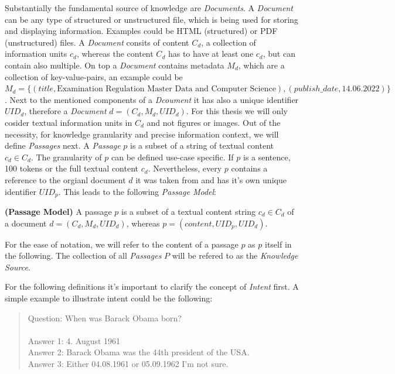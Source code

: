 Substantially the fundamental source of knowledge are \textit{Documents}. A \textit{Document} can be any type of structured or unstructured file, which is being used for storing and displaying information. Examples could be HTML (structured) or PDF (unstructured) files. A \textit{Document} consits of content $C_d$, a collection of information units $c_d$, whereas the content $C_d$ has to have at least one $c_d$, but can contain also multiple. On top a \textit{Document} contains metadata $M_d$, which are a collection of key-value-pairs, an example could be $M_d = \{(title,\text{Examination Regulation Master Data and Computer Science}),\allowbreak (publish\_date \allowbreak, 14.06.2022)\}$. Next to the mentioned components of a \textit{Dcoument} it has also a unique identifier $UID_d$, therefore a \textit{Document} $d = (C_d, M_d, UID_d)$. For this thesis we will only cosider textual information units in $C_d$ and not figures or images. Out of the necessity, for knowledge granularity and precise information context, we will define \textit{Passages} next. A \textit{Passage} $p$ is a subset of a string of textual content $c_d \in C_d$. The granularity of $p$ can be defined use-case specific. If $p$ is a sentence, 100 tokens or the full textual content $c_d$. Nevertheless, every $p$ contains a reference to the orgianl document $d$ it was taken from and has it's own unique identifier $UID_p$. This leads to the following \textit{Passage Model}:
\begin{definition}
    \textbf{(Passage Model)} A passage $p$ is a subset of a textual content string $c_d \in C_d$ of a document $d = (C_d,M_d, UID_d)$, whereas $p = (content, UID_p, UID_d)$.
    \label{def:passage_model}
\end{definition}

For the ease of notation, we will refer to the content of a passage $p$ as $p$ itself in the following. The collection of all \textit{Passages} $P$ will be refered to as the \textit{Knowledge Source}. 

For the following definitions it's important to clarify the concept of \textit{Intent} first. A simple example to illustrate intent could be the following:

\begin{quotation}
\noindent Question: When was Barack Obama born? \\\\
Answer 1: 4. August 1961 \\
Answer 2: Barack Obama was the 44th president of the USA. \\
Answer 3: Either 04.08.1961 or 05.09.1962 I'm not sure. 
\end{quotation}

